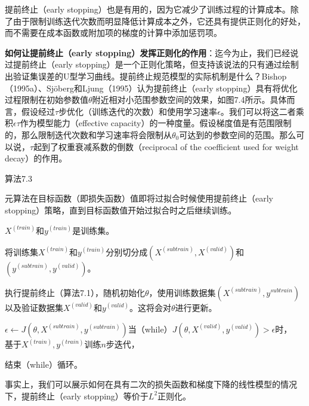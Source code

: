 提前终止（early stopping）也是有用的，因为它减少了训练过程的计算成本。除了由于限制训练迭代次数而明显降低计算成本之外，它还具有提供正则化的好处，而不需要在成本函数或附加项的梯度的计算中添加惩罚项。

\textbf{如何让提前终止（early stopping）发挥正则化的作用}：迄今为止，我们已经说过提前终止（early stopping）是一个正则化策略，但支持该说法的只有通过绘制出验证集误差的U型学习曲线。提前终止规范模型的实际机制是什么？Bishop（1995a）、Sjöberg和Ljung（1995）认为提前终止（early stopping）具有将优化过程限制在初始参数值$\theta$附近相对小范围参数空间的效果，如图7.4所示。具体而言，假设经过$\tau$步优化（训练迭代的次数）和使用学习速率$\epsilon$。我们可以将这二者乘积$\epsilon \tau$作为模型能力（effective capacity）的一种度量。假设梯度值是有范围限制的，那么限制迭代次数和学习速率将会限制从$\theta_0$可达到的参数空间的范围。那么可以说，$\tau$起到了权重衰减系数的倒数（reciprocal of the coefficient used for weight decay）的作用。

算法7.3

元算法在目标函数（即损失函数）值即将过拟合时候使用提前终止（early stopping）策略，直到目标函数值开始过拟合时之后继续训练。

$X^{(train)}$和$y^{(train)}$是训练集。

将训练集$X^{(train)}$和$y^{(train)}$分别切分成$(X^{(subtrain)}, X^{(valid)})$和$(y^{(subtrain)}, y^{(valid)})$。

执行提前终止（算法7.1），随机初始化$\theta$，使用训练数据集$(X^{(subtrain)}, y^{subtrain})$以及验证数据集$X^{(valid)}$和$y^{(valid)}$。这将会对$\theta$进行更新。

$\epsilon \leftarrow J(\theta, X^{(subtrain)}, y^{(subtrain)})$当（while）$J(\theta, X^{(valid)}, y^{(valid)}) > \epsilon$时，$\quad$基于$X^{(train)}, y^{(train)}$训练$n$步迭代，

结束（while）循环。

事实上，我们可以展示如何在具有二次的损失函数和梯度下降的线性模型的情况下，提前终止（early stopping）等价于$L^2$正则化。


